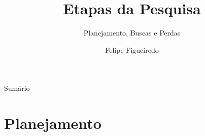 \documentclass{beamer}
\title%
{Etapas da Pesquisa}
\subtitle
{Planejamento, Buscas e Perdas} %
\author%
{Felipe Figueiredo}%
\institute[] %
{
}
\date%
{}
\begin{document}
\begin{frame}
  \titlepage
\end{frame}

\begin{frame}{Sumário}
  \tableofcontents
\end{frame}








\section{Planejamento}
\end{document}
